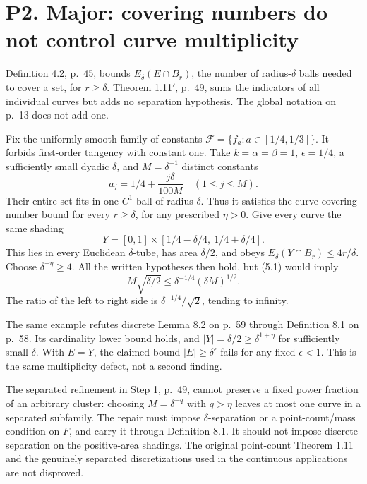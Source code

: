 \documentclass[10pt]{article}
\begin{document}
\section*{P2. Major: covering numbers do not control curve multiplicity}
Definition 4.2, p. 45, bounds \(E_\delta(E\cap B_r)\), the number of radius-\(\delta\) balls needed to cover a set, for \(r\ge\delta\). Theorem 1.11\('\), p. 49, sums the indicators of all individual curves but adds no separation hypothesis. The global notation on p. 13 does not add one.\par
Fix the uniformly smooth family of constants \(\mathcal F=\{f_a:a\in[1/4,1/3]\}\). It forbids first-order tangency with constant one. Take \(k=\alpha=\beta=1\), \(\epsilon=1/4\), a sufficiently small dyadic \(\delta\), and \(M=\delta^{-1}\) distinct constants \[a_j=1/4+\frac{j\delta}{100M}\quad(1\le j\le M).\] Their entire set fits in one \(C^1\) ball of radius \(\delta\). Thus it satisfies the curve covering-number bound for every \(r\ge\delta\), for any prescribed \(\eta>0\). Give every curve the same shading \[Y=[0,1]\times[1/4-\delta/4,\ 1/4+\delta/4].\] This lies in every Euclidean \(\delta\)-tube, has area \(\delta/2\), and obeys \(E_\delta(Y\cap B_r)\le4r/\delta\). Choose \(\delta^{-\eta}\ge4\). All the written hypotheses then hold, but (5.1) would imply \[M\sqrt{\delta/2}
 \le \delta^{-1/4}(\delta M)^{1/2}.\] The ratio of the left to right side is \(\delta^{-1/4}/\sqrt2\), tending to infinity.\par
The same example refutes discrete Lemma 8.2 on p. 59 through Definition 8.1 on p. 58. Its cardinality lower bound holds, and \(|Y|=\delta/2\ge\delta^{1+\eta}\) for sufficiently small \(\delta\). With \(E=Y\), the claimed bound \(|E|\ge\delta^\epsilon\) fails for any fixed \(\epsilon<1\). This is the same multiplicity defect, not a second finding.\par
The separated refinement in Step 1, p. 49, cannot preserve a fixed power fraction of an arbitrary cluster: choosing \(M=\delta^{-q}\) with \(q>\eta\) leaves at most one curve in a separated subfamily. The repair must impose \(\delta\)-separation or a point-count/mass condition on \(F\), and carry it through Definition 8.1. It should not impose discrete separation on the positive-area shadings. The original point-count Theorem 1.11 and the genuinely separated discretizations used in the continuous applications are not disproved.\par
\end{document}
